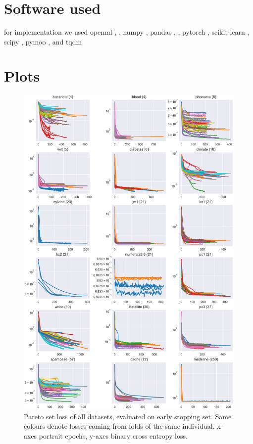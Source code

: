\documentclass[twoside,11pt]{article}
\begin{document}


\vskip 0.2in



\appendix
\section{Software used}
for implementation we used
openml \cite{OpenML}, \cite{OpenMLPython},
numpy \cite{numpy},
pandas \cite{pandas1}, \cite{pandas2},
pytorch \cite{PyTorch},
scikit-learn \cite{scikit-learn},
scipy \cite{SciPy},
pymoo \cite{pymoo}, and
tqdm \cite{tqdm}

\section{Plots}
\begin{figure}
  \centering
  \includegraphics[width=0.9\linewidth]{../code/export/plot_early_stopping_losses_pareto_set.png}
  \caption{Pareto set loss of all datasets, evaluated on early stopping set. Same colours denote losses coming from folds of the same individual.
            x-axes portrait epochs, y-axes binary cross entropy loss.}
  \label{fig-es-losses}
\end{figure}
\end{document}
